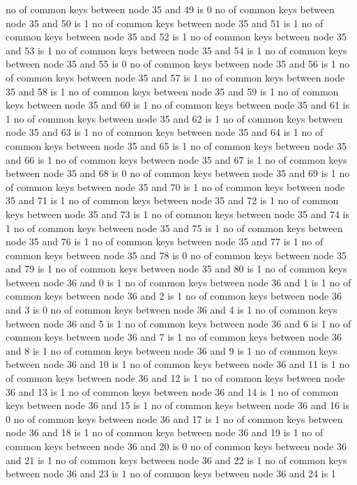 no of common keys between node 35 and 49 is 0
no of common keys between node 35 and 50 is 1
no of common keys between node 35 and 51 is 1
no of common keys between node 35 and 52 is 1
no of common keys between node 35 and 53 is 1
no of common keys between node 35 and 54 is 1
no of common keys between node 35 and 55 is 0
no of common keys between node 35 and 56 is 1
no of common keys between node 35 and 57 is 1
no of common keys between node 35 and 58 is 1
no of common keys between node 35 and 59 is 1
no of common keys between node 35 and 60 is 1
no of common keys between node 35 and 61 is 1
no of common keys between node 35 and 62 is 1
no of common keys between node 35 and 63 is 1
no of common keys between node 35 and 64 is 1
no of common keys between node 35 and 65 is 1
no of common keys between node 35 and 66 is 1
no of common keys between node 35 and 67 is 1
no of common keys between node 35 and 68 is 0
no of common keys between node 35 and 69 is 1
no of common keys between node 35 and 70 is 1
no of common keys between node 35 and 71 is 1
no of common keys between node 35 and 72 is 1
no of common keys between node 35 and 73 is 1
no of common keys between node 35 and 74 is 1
no of common keys between node 35 and 75 is 1
no of common keys between node 35 and 76 is 1
no of common keys between node 35 and 77 is 1
no of common keys between node 35 and 78 is 0
no of common keys between node 35 and 79 is 1
no of common keys between node 35 and 80 is 1
no of common keys between node 36 and 0 is 1
no of common keys between node 36 and 1 is 1
no of common keys between node 36 and 2 is 1
no of common keys between node 36 and 3 is 0
no of common keys between node 36 and 4 is 1
no of common keys between node 36 and 5 is 1
no of common keys between node 36 and 6 is 1
no of common keys between node 36 and 7 is 1
no of common keys between node 36 and 8 is 1
no of common keys between node 36 and 9 is 1
no of common keys between node 36 and 10 is 1
no of common keys between node 36 and 11 is 1
no of common keys between node 36 and 12 is 1
no of common keys between node 36 and 13 is 1
no of common keys between node 36 and 14 is 1
no of common keys between node 36 and 15 is 1
no of common keys between node 36 and 16 is 0
no of common keys between node 36 and 17 is 1
no of common keys between node 36 and 18 is 1
no of common keys between node 36 and 19 is 1
no of common keys between node 36 and 20 is 0
no of common keys between node 36 and 21 is 1
no of common keys between node 36 and 22 is 1
no of common keys between node 36 and 23 is 1
no of common keys between node 36 and 24 is 1
